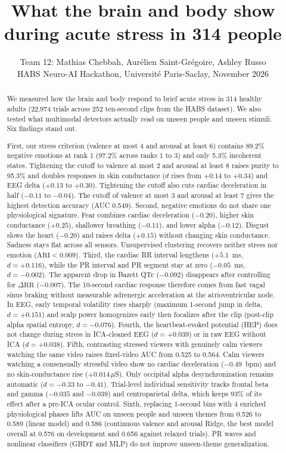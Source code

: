 \documentclass[10pt]{article}
\title{What the brain and body show during acute stress in 314 people}
\author{Team 12: Mathias Chebbah, Aurélien Saint-Grégoire, Ashley Russo\\
\small HABS Neuro-AI Hackathon, Université Paris-Saclay, November 2026}
\date{}
\begin{document}
\maketitle

\begin{abstract}
\noindent We measured how the brain and body respond to brief acute stress in 314 healthy adults (22,974 trials across 252 ten-second clips from the HABS dataset). We also tested what multimodal detectors actually read on unseen people and unseen stimuli. Six findings stand out.

First, our stress criterion (valence at most 4 and arousal at least 6) contains 89.2\% negative emotions at rank 1 (97.2\% across ranks 1 to 3) and only 5.3\% incoherent states. Tightening the cutoff to valence at most 2 and arousal at least 8 raises purity to 95.3\% and doubles responses in skin conductance ($d$ rises from $+0.14$ to $+0.34$) and EEG delta ($+0.13$ to $+0.30$). Tightening the cutoff also cuts cardiac deceleration in half ($-0.11$ to $-0.04$). The cutoff of valence at most 3 and arousal at least 7 gives the highest detection accuracy (AUC 0.549). Second, negative emotions do not share one physiological signature. Fear combines cardiac deceleration ($-0.20$), higher skin conductance ($+0.25$), shallower breathing ($-0.11$), and lower alpha ($-0.12$). Disgust slows the heart ($-0.20$) and raises delta ($+0.15$) without changing skin conductance. Sadness stays flat across all sensors. Unsupervised clustering recovers neither stress nor emotion ($\mathrm{ARI} < 0.009$). Third, the cardiac RR interval lengthens ($+5.1$~ms, $d = +0.116$), while the PR interval and PR segment stay at zero ($-0.05$~ms, $d = -0.002$). The apparent drop in Bazett QTc ($-0.092$) disappears after controlling for $\Delta\mathrm{RR}$ ($-0.007$). The 10-second cardiac response therefore comes from fast vagal sinus braking without measurable adrenergic acceleration at the atrioventricular node. In EEG, early temporal volatility rises sharply (maximum 1-second jump in delta, $d = +0.151$) and scalp power homogenizes early then focalizes after the clip (post-clip alpha spatial entropy, $d = -0.076$). Fourth, the heartbeat-evoked potential (HEP) does not change during stress in ICA-cleaned EEG ($d = +0.039$) or in raw EEG without ICA ($d = +0.038$). Fifth, contrasting stressed viewers with genuinely calm viewers watching the same video raises fixed-video AUC from 0.525 to 0.564. Calm viewers watching a consensually stressful video show no cardiac deceleration ($-0.49$~bpm) and no skin-conductance rise ($+0.014\,\mu$S). Only occipital alpha desynchronization remains automatic ($d = -0.33$ to $-0.41$). Trial-level individual sensitivity tracks frontal beta and gamma ($-0.035$ and $-0.039$) and centroparietal delta, which keeps 93\% of its effect after a pre-ICA ocular control. Sixth, replacing 1-second bins with 4 enriched physiological phases lifts AUC on unseen people and unseen themes from 0.526 to 0.589 (linear model) and 0.586 (continuous valence and arousal Ridge, the best model overall at 0.576 on development and 0.656 against relaxed trials). PR waves and nonlinear classifiers (GBDT and MLP) do not improve unseen-theme generalization.
\end{abstract}
\end{document}
